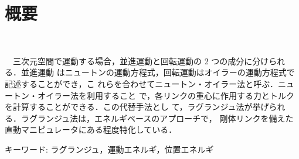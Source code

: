 \chapter*{概要}
\thispagestyle{empty}
%
\begin{center}
  \scalebox{1.5}{ラグランジュ法}\\
\end{center}
\vspace{1.0zh}
%
　三次元空間で運動する場合，並進運動と回転運動の 2 つの成分に分けられる．並進運動
はニュートンの運動方程式，回転運動はオイラーの運動方程式で記述することができ，こ
れらを合わせてニュートン・オイラー法と呼ぶ．ニュートン・オイラー法を利用すること
で，各リンクの重心に作用する力とトルクを計算することができる．この代替手法とし
て，ラグランジュ法が挙げられる．ラグランジュ法は，エネルギベースのアプローチで，
剛体リンクを備えた直動マニピュレータにある程度特化している．
\vspace{1.0zh}

キーワード: ラグランジュ，運動エネルギ，位置エネルギ
